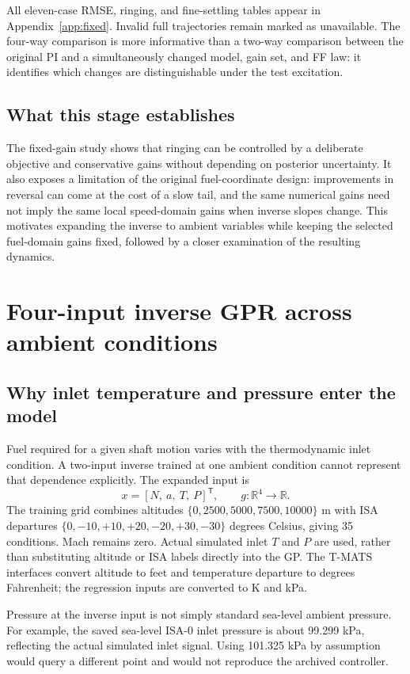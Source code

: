 All eleven-case RMSE, ringing, and fine-settling tables appear in Appendix~\ref{app:fixed}. Invalid full trajectories remain marked as unavailable. The four-way comparison is more informative than a two-way comparison between the original PI and a simultaneously changed model, gain set, and FF law: it identifies which changes are distinguishable under the test excitation.

\section{What this stage establishes}
The fixed-gain study shows that ringing can be controlled by a deliberate objective and conservative gains without depending on posterior uncertainty. It also exposes a limitation of the original fuel-coordinate design: improvements in reversal can come at the cost of a slow tail, and the same numerical gains need not imply the same local speed-domain gains when inverse slopes change. This motivates expanding the inverse to ambient variables while keeping the selected fuel-domain gains fixed, followed by a closer examination of the resulting dynamics.


\chapter{Four-input inverse GPR across ambient conditions}
\section{Why inlet temperature and pressure enter the model}
Fuel required for a given shaft motion varies with the thermodynamic inlet condition. A two-input inverse trained at one ambient condition cannot represent that dependence explicitly. The expanded input is
\begin{equation}
x=[N,\ a,\ T,\ P]^\mathsf T,\qquad g:\mathbb R^4\rightarrow\mathbb R.
\end{equation}
The training grid combines altitudes $\{0,2500,5000,7500,10000\}$ m with ISA departures $\{0,-10,+10,+20,-20,+30,-30\}$ degrees Celsius, giving 35 conditions. Mach remains zero. Actual simulated inlet $T$ and $P$ are used, rather than substituting altitude or ISA labels directly into the GP. The T-MATS interfaces convert altitude to feet and temperature departure to degrees Fahrenheit; the regression inputs are converted to K and kPa.

Pressure at the inverse input is not simply standard sea-level ambient pressure. For example, the saved sea-level ISA-0 inlet pressure is about 99.299 kPa, reflecting the actual simulated inlet signal. Using 101.325 kPa by assumption would query a different point and would not reproduce the archived controller.

